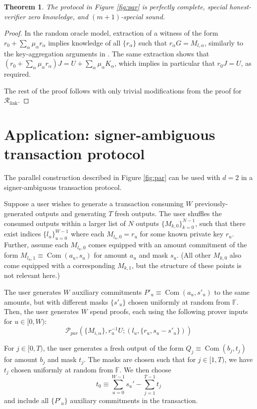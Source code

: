 \documentclass{article}
\newcommand{\F}{\mathbb{F}}
\newcommand{\com}{\operatorname{Com}}
\newtheorem{theorem}{Theorem}
\theoremstyle{definition}
\begin{document}
\begin{theorem}
The protocol in Figure \ref{fig:par} is perfectly complete, special honest-verifier zero knowledge, and $(m+1)$-special sound.
\end{theorem}

\begin{proof}
In the random oracle model, extraction of a witness of the form $r_0 + \sum_{\alpha} \mu_\alpha r_\alpha$ implies knowledge of all $\{r_\alpha\}$ such that $r_\alpha G = M_{l,\alpha}$, similarly to the key-aggregation arguments in \cite{musig}.
The same extraction shows that $\left(r_0 + \sum_{\alpha} \mu_\alpha r_\alpha\right)J = U + \sum_{\alpha} \mu_\alpha K_\alpha$, which implies in particular that $r_0J = U$, as required.

The rest of the proof follows with only trivial modifications from the proof for $\mathcal{R}_{\text{link}}$.
\end{proof}


\section{Application: signer-ambiguous transaction protocol}
The parallel construction described in Figure \ref{fig:par} can be used with $d = 2$ in a signer-ambiguous transaction protocol.

Suppose a user wishes to generate a transaction consuming $W$ previously-generated outputs and generating $T$ fresh outputs.
The user shuffles the consumed outputs within a larger list of $N$ outputs $\{M_{k,0}\}_{k=0}^{N-1}$, such that there exist indices $\{l_u\}_{u=0}^{W-1}$ where each $M_{l_u,0} = r_u$ for some known private key $r_u$.
Further, assume each $M_{l_u,0}$ comes equipped with an amount commitment of the form $M_{l_u,1} \equiv \com(a_u,s_u)$ for amount $a_u$ and mask $s_u$.
(All other $M_{k,0}$ also come equipped with a corresponding $M_{k,1}$, but the structure of these points is not relevant here.)

The user generates $W$ auxiliary commitments $P'_u \equiv \com(a_u,s'_u)$ to the same amounts, but with different masks $\{s'_u\}$ chosen uniformly at random from $\F$.
Then, the user generates $W$ spend proofs, each using the following prover inputs for $u \in [0,W)$:
$$\mathcal{P}_{par}(\{M_{i,\alpha}\},r_u^{-1}U;(l_u,\{r_u,s_u-s'_u\}))$$

For $j \in [0,T)$, the user generates a fresh output of the form $Q_j \equiv \com(b_j,t_j)$ for amount $b_j$ and mask $t_j$.
The masks are chosen such that for $j \in [1,T)$, we have $t_j$ chosen uniformly at random from $\F$.
We then choose $$t_0 \equiv \sum_{u=0}^{W-1} s_u' -\sum_{j=1}^{T-1} t_j$$ and include all $\{P'_u\}$ auxiliary commitments in the transaction.
\end{document}
